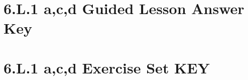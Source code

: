 \documentclass[a4paper,12pt]{article}
\begin{document}
\newpage
\section{6.L.1 a,c,d Guided Lesson Answer Key}

\newpage


\newpage
\section{6.L.1 a,c,d Exercise Set KEY}

\end{document}
